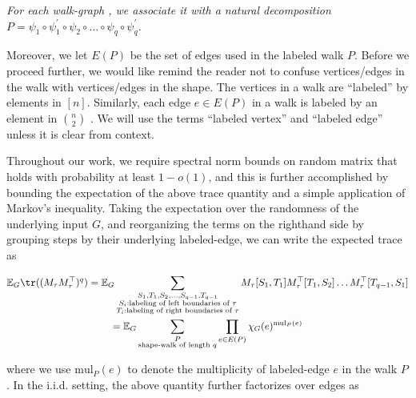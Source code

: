 \documentclass[10pt,a4paper]{article}
\begin{document}
\emph{For each walk-graph , we associate it with a natural decomposition $P=\psi_{1}\circ\psi_{1}^{\prime}\circ\psi_{2}\circ\dots\circ\psi_{q}\circ\psi_{q}^{\prime}$.}\par






Moreover, we let $E(P)$ be the set of edges used in the labeled walk $P$.
Before we proceed further, we would like remind the reader not to confuse vertices/edges in the walk with vertices/edges in the shape. The vertices in a walk are “labeled” by elements in $[n]$. Similarly, each edge $e\in E(P)$ in a walk is labeled by an element in $\binom{n}{2}$ . We will use the terms “labeled vertex” and “labeled edge” unless it is clear from context.\par




Throughout our work, we require spectral norm bounds on random matrix that holds with probability at least $1-o(1)$, and this is further accomplished by bounding the expectation of the above trace quantity and a simple application of Markov’s inequality. Taking the expectation over the randomness of the underlying input $G$, and reorganizing the terms on the righthand side by grouping steps by their underlying labeled-edge,
we can write the expected trace as\par




\[\begin{gathered}
\displaystyle\mathbb{E}_{G}\tr((M_{\tau}M_{\tau}^{\top})^{q}) \displaystyle=\mathbb{E}_{G}\sum_{\begin{subarray}{c}S_{1},T_{1},S_{2},\dots,S_{q-1},T_{q-1}\\
S_{i}:\text{labeling of left boundaries of $\tau$}\\
T_{i}:\text{labeling of right boundaries of $\tau$}\end{subarray}}M_{\tau}[S_{1},T_{1}]M_{\tau}^{\top}[T_{1},S_{2}]\dots M_{\tau}^{\top}[T_{q-1},S_{1}] \\
\displaystyle=\mathbb{E}_{G}\sum_{\begin{subarray}{c}P\\
\text{shape-walk of length }q\end{subarray}}\prod_{e\in E(P)}\chi_{G}(e)^{\text{mul}_{P}(e)}
\end{gathered}\]


where we use $\text{mul}_{P}(e)$ to denote the multiplicity of labeled-edge $e$ in the walk $P$.
In the i.i.d. setting, the above quantity further factorizes over edges as\par
\end{document}
